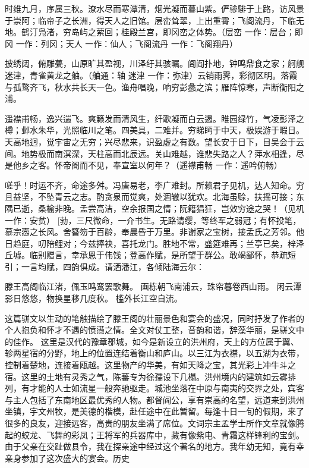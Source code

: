 \documentclass{article}
\begin{document}
时维九月，序属三秋。潦水尽而寒潭清，烟光凝而暮山紫。俨骖騑于上路，访风景于崇阿；临帝子之长洲，得天人之旧馆。层峦耸翠，上出重霄；飞阁流丹，下临无地。鹤汀凫渚，穷岛屿之萦回；桂殿兰宫，即冈峦之体势。（层峦 一作：层台；即冈 一作：列冈；天人 一作：仙人；飞阁流丹 一作：飞阁翔丹）

披绣闼，俯雕甍，山原旷其盈视，川泽纡其骇瞩。闾阎扑地，钟鸣鼎食之家；舸舰迷津，青雀黄龙之舳。（舳通：轴 迷津 一作：弥津）云销雨霁，彩彻区明。落霞与孤鹜齐飞，秋水共长天一色。渔舟唱晚，响穷彭蠡之滨；雁阵惊寒，声断衡阳之浦。
\newpage    

遥襟甫畅，逸兴遄飞。爽籁发而清风生，纤歌凝而白云遏。睢园绿竹，气凌彭泽之樽；邺水朱华，光照临川之笔。四美具，二难并。穷睇眄于中天，极娱游于暇日。天高地迥，觉宇宙之无穷；兴尽悲来，识盈虚之有数。望长安于日下，目吴会于云间。地势极而南溟深，天柱高而北辰远。关山难越，谁悲失路之人？萍水相逢，尽是他乡之客。怀帝阍而不见，奉宣室以何年？（遥襟甫畅 一作：遥吟俯畅）

嗟乎！时运不齐，命途多舛。冯唐易老，李广难封。所赖君子见机，达人知命。穷且益坚，不坠青云之志。酌贪泉而觉爽，处涸辙以犹欢。北海虽赊，扶摇可接；东隅已逝，桑榆非晚。孟尝高洁，空余报国之情；阮籍猖狂，岂效穷途之哭！（见机 一作：安贫）
\twocolumn
[勃，三尺微命，一介书生。无路请缨，等终军之弱冠；有怀投笔，慕宗悫之长风。舍簪笏于百龄，奉晨昏于万里。非谢家之宝树，接孟氏之芳邻。他日趋庭，叨陪鲤对；今兹捧袂，喜托龙门。胜地不常，盛筵难再；兰亭已矣，梓泽丘墟。临别赠言，幸承恩于伟饯；登高作赋，是所望于群公。敢竭鄙怀，恭疏短引；一言均赋，四韵俱成。请洒潘江，各倾陆海云尔：

滕王高阁临江渚，佩玉鸣鸾罢歌舞。 画栋朝飞南浦云，珠帘暮卷西山雨。 闲云潭影日悠悠，物换星移几度秋。 槛外长江空自流。

这篇骈文以生动的笔触描绘了滕王阁的壮丽景色和宴会的盛况，同时抒发了作者的个人抱负和怀才不遇的愤懑之情。全文对仗工整，音韵和谐，辞藻华丽，是骈文中的佳作。
这里是汉代的豫章郡城，如今是新设立的洪州府，天上的方位属于翼、轸两星宿的分野，地上的位置连结着衡山和庐山。以三江为衣襟，以五湖为衣带，控制着楚地，连接着瓯越。这里物产的华美，有如天降之宝，其光彩上冲牛斗之宿。这里的土地有灵秀之气，陈蕃专为徐孺设下几榻。洪州境内的建筑如云雾排列，有才能的人士如流星一般奔驰驱走。城池坐落在中原与南夷的交界之处，宾客与主人包括了东南地区最优秀的人物。都督阎公，享有崇高的名望，远道来到洪州坐镇，宇文州牧，是美德的楷模，赴任途中在此暂留。每逢十日一旬的假期，来了很多的良友，迎接远客，高贵的朋友坐满了席位。文词宗主孟学士所作文章就像腾起的蛟龙、飞舞的彩凤；王将军的兵器库中，藏有像紫电、青霜这样锋利的宝剑。由于父亲在交趾做县令，我在探亲途中经过这个著名的地方。我年幼无知，竟有幸亲身参加了这次盛大的宴会。历史
\end{document}
